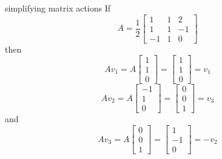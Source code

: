\documentclass{beamer}
\begin{document}
\begin{frame}{simplifying matrix actions}
	If
	\begin{equation*}
	A = \frac{1}{2}\left[
	\begin{matrix}
	1&1&2\\
	1&1&-1\\
	-1&1&0
	\end{matrix}
	\right]
	\end{equation*}
	then
	\begin{equation*}
		Av_1 = 
		A \left[
		\begin{matrix}
		1\\
		1\\
		0
		\end{matrix}
		\right] = 
		\left[
		\begin{matrix}
		1\\
		1\\
		0
		\end{matrix}
		\right] = v_1
	\end{equation*}
	\begin{equation*}
		Av_2 =
		A \left[
		\begin{matrix}
		-1\\
		1\\
		0
		\end{matrix}
		\right] = \left[
		\begin{matrix}
		0\\
		0\\
		1
		\end{matrix}
		\right] = v_3
	\end{equation*}
	and
	\begin{equation*}
		Av_3 =
		A \left[
		\begin{matrix}
		0\\
		0\\
		1
		\end{matrix}
		\right] =
		\left[
		\begin{matrix}
		1\\
		-1\\
		0
		\end{matrix}
		\right] = -v_2
	\end{equation*}
\end{frame}
\end{document}
